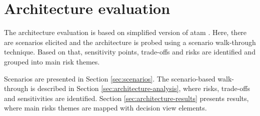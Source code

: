 \documentclass{llncs}
\begin{document}

\section{Architecture evaluation}
\label{sec:evaluation}

The architecture evaluation is based on simplified version of \gls{atam} \cite{kazman2000} . Here, there are scenarios elicited and the architecture is probed using a scenario walk-through technique. Based on that, sensitivity points, trade-offs and risks are identified and grouped into main risk themes. 

Scenarios are presented in Section \ref{sec:scenarios}. The scenario-based walk-through is described in Section \ref{sec:architecture-analysis}, where risks, trade-offs and sensitivities are identified. Section \ref{sec:architecture-results} presents results, where main risks themes are mapped with decision view elements.
\end{document}
